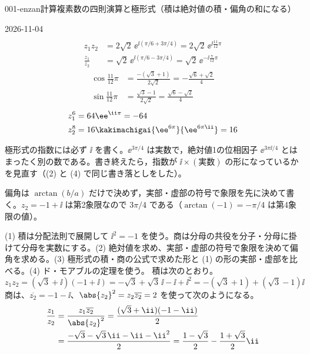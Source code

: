 \documentclass[uplatex,dvipdfmx,a4paper,11pt]{jsarticle}
\begin{document}
\begin{mondai}{001-enzan}{計算}{複素数の四則演算と極形式（積は絶対値の積・偏角の和になる）}
\begin{kotaeutsushi}{2026-11-04}
\begin{align*}
\end{align*}
\begin{align*}
z_{1}z_{2}&=2\sqrt{2}\,\ee^{\ii(\pi/6+3\pi/4)}=2\sqrt{2}\,\ee^{\ii\frac{11}{12}\pi}\\
\frac{z_{1}}{z_{2}}&=\sqrt{2}\,\ee^{\ii(\pi/6-3\pi/4)}=\sqrt{2}\,\ee^{-\ii\frac{7}{12}\pi}
\end{align*}
\begin{align*}
\cos\frac{11}{12}\pi&=\frac{-(\sqrt{3}+1)}{2\sqrt{2}}=-\frac{\sqrt{6}+\sqrt{2}}{4}\\
\sin\frac{11}{12}\pi&=\frac{\sqrt{3}-1}{2\sqrt{2}}=\frac{\sqrt{6}-\sqrt{2}}{4}
\end{align*}
\begin{align*}
z_{1}^{6}&=64\ee^{\ii\pi}=-64\\
z_{2}^{8}&=16\kakimachigai{\ee^{6\pi}}{\ee^{6\pi\ii}}=16
\end{align*}
\end{kotaeutsushi}
\begin{kizuki}
\item 極形式の指数には必ず $\ii$ を書く。$\ee^{3\pi/4}$ は実数で，絶対値1の位相因子 $\ee^{3\pi\ii/4}$ とはまったく別の数である。書き終えたら，指数が $\ii\times(\text{実数})$ の形になっているかを見直す（(2) と (4) で同じ書き落としをした）。
\item 偏角は $\arctan(b/a)$ だけで決めず，実部・虚部の符号で象限を先に決めて書く。$z_{2}=-1+\ii$ は第2象限なので $3\pi/4$ である（$\arctan(-1)=-\pi/4$ は第4象限の値）。
\end{kizuki}
\begin{tadashii}
\houshin (1) 積は分配法則で展開して $\ii^{2}=-1$ を使う。商は分母の共役を分子・分母に掛けて分母を実数にする。(2) 絶対値を求め、実部・虚部の符号で象限を決めて偏角を求める。(3) 極形式の積・商の公式で求めた形と (1) の形の実部・虚部を比べる。(4) ド・モアブルの定理を使う。
\keisan {} 積は次のとおり。
\[ z_{1}z_{2}=(\sqrt{3}+\ii)(-1+\ii)=-\sqrt{3}+\sqrt{3}\,\ii-\ii+\ii^{2}=-(\sqrt{3}+1)+(\sqrt{3}-1)\ii \]
商は、$\overline{z_{2}}=-1-\ii$、$\abs{z_{2}}^{2}=z_{2}\overline{z_{2}}=2$ を使って次のようになる。
\begin{align*}
  \frac{z_{1}}{z_{2}}&=\frac{z_{1}\overline{z_{2}}}{\abs{z_{2}}^{2}}=\frac{(\sqrt{3}+\ii)(-1-\ii)}{2}\\
  &=\frac{-\sqrt{3}-\sqrt{3}\,\ii-\ii-\ii^{2}}{2}=\frac{1-\sqrt{3}}{2}-\frac{1+\sqrt{3}}{2}\ii

\end{align*}
\end{tadashii}
\end{mondai}
\end{document}
